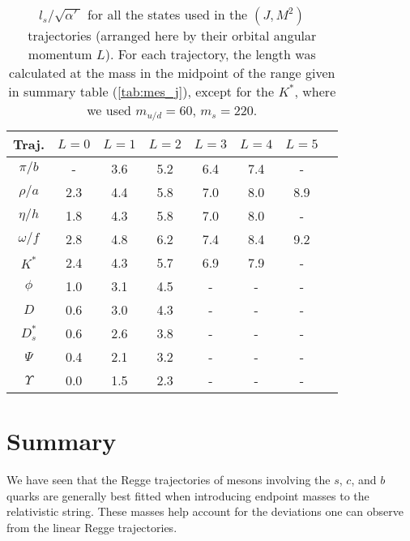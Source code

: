 \documentclass[11pt,a4]{article}
\newcommand{\alp}{\ensuremath{\alpha'\:}}
\newcommand{\mud}{m_{u/d}}
\begin{document}
\begin{table}[t!] \centering
	\begin{tabular}{|c|c|c|c|c|c|c|c|} \hline
	Traj. & \(L = 0\) & \(L = 1\) & \(L = 2\) & \(L = 3\) & \(L = 4\) & \(L = 5\) \\ \hline
	
	\(\pi/b\) & - & 3.6 & 5.2 & 6.4 & 7.4 & - \\
	
	\(\rho/a\) & 2.3 & 4.4 & 5.8 & 7.0 & 8.0 & 8.9 \\
	
	\(\eta/h\) & 1.8 & 4.3 & 5.8 & 7.0 & 8.0 & - \\
	
	\(\omega/f\) & 2.8 & 4.8 & 6.2 & 7.4 & 8.4 & 9.2 \\
	
	\(K^*\) & 2.4 & 4.3 & 5.7 & 6.9 & 7.9 & - \\
	
	\(\phi\) & 1.0 & 3.1 & 4.5 & - & - & - \\
	
	\(D\) & 0.6 & 3.0 & 4.3 & - & - & - \\
	
	\(D^*_s\) & 0.6 & 2.6 & 3.8 & - & - & - \\

	\(\Psi\) & 0.4 & 2.1 & 3.2 & - & - & - \\
	
	\(\Upsilon\) & 0.0 & 1.5 & 2.3 & - & - & - \\ \hline

	\end{tabular} \caption{\label{tab:lengths} \(l_s/\sqrt{\alp}\) for all the states used in the \((J,M^2)\)  trajectories (arranged here by their orbital angular momentum \(L\)). For each trajectory, the length was calculated at the mass in the midpoint of the range given in summary table (\ref{tab:mes_j}), except for the \(K^*\), where we used \(\mud = 60\), \(m_s = 220\).}
\end{table}

\section{Summary}
We have seen that the Regge trajectories of mesons involving the \(s\), \(c\), and \(b\) quarks are generally best fitted when introducing endpoint masses to the relativistic string. These masses help account for the deviations one can observe from the linear Regge trajectories.
\end{document}
